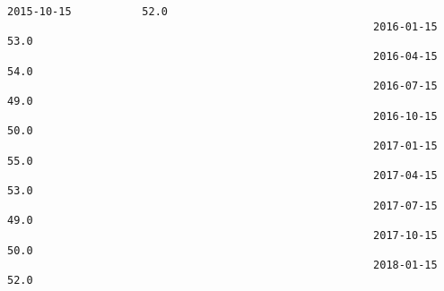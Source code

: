 \documentclass[11pt]{article}
\begin{document}
\begin{Verbatim}[commandchars=\\\{\}]
                                                         2015-10-15           52.0   
                                                         2016-01-15           53.0   
                                                         2016-04-15           54.0   
                                                         2016-07-15           49.0   
                                                         2016-10-15           50.0   
                                                         2017-01-15           55.0   
                                                         2017-04-15           53.0   
                                                         2017-07-15           49.0   
                                                         2017-10-15           50.0   
                                                         2018-01-15           52.0   
        

\end{Verbatim}
\end{document}
